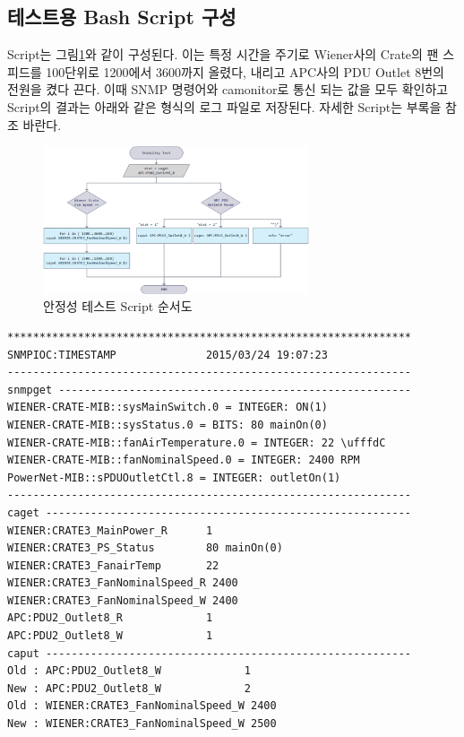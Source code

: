\documentclass[11pt
  , a4paper
  , article
  , oneside
]{memoir}
\begin{document}
\subsection{테스트용 Bash Script 구성}

Script는 그림\ref{fig:stability}와 같이 구성된다. 이는 특정 시간을 주기로 Wiener사의 Crate의 팬 스피드를 100단위로 1200에서 3600까지 올렸다, 내리고 APC사의 PDU Outlet 8번의 전원을 켰다 끈다. 이때 SNMP 명령어와 camonitor로 통신 되는 값을 모두 확인하고 Script의 결과는 아래와 같은 형식의 로그 파일로 저장된다. 자세한 Script는 부록을 참조 바란다.

\begin{figure}[h!]
  \centering
  \includegraphics[width=0.7\textwidth]{./images/stability.eps}
  \caption{안정성 테스트 Script 순서도}
  \label{fig:stability}   
\end{figure}

\begin{lstlisting}[style=termstyle]
***************************************************************
SNMPIOC:TIMESTAMP              2015/03/24 19:07:23
---------------------------------------------------------------
snmpget -------------------------------------------------------
WIENER-CRATE-MIB::sysMainSwitch.0 = INTEGER: ON(1)
WIENER-CRATE-MIB::sysStatus.0 = BITS: 80 mainOn(0) 
WIENER-CRATE-MIB::fanAirTemperature.0 = INTEGER: 22 \ufffdC
WIENER-CRATE-MIB::fanNominalSpeed.0 = INTEGER: 2400 RPM
PowerNet-MIB::sPDUOutletCtl.8 = INTEGER: outletOn(1)
---------------------------------------------------------------
caget ---------------------------------------------------------
WIENER:CRATE3_MainPower_R      1
WIENER:CRATE3_PS_Status        80 mainOn(0)
WIENER:CRATE3_FanairTemp       22
WIENER:CRATE3_FanNominalSpeed_R 2400
WIENER:CRATE3_FanNominalSpeed_W 2400
APC:PDU2_Outlet8_R             1
APC:PDU2_Outlet8_W             1
caput ---------------------------------------------------------
Old : APC:PDU2_Outlet8_W             1
New : APC:PDU2_Outlet8_W             2
Old : WIENER:CRATE3_FanNominalSpeed_W 2400
New : WIENER:CRATE3_FanNominalSpeed_W 2500
\end{lstlisting}
\end{document}

